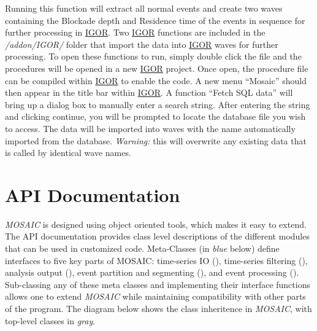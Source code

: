 \documentclass[letterpaper,10pt,english]{sphinxmanual}
\begin{document}
Running this function will extract all normal events and create two waves containing the Blockade depth and Residence time of the events in sequence for further processing in \href{http://www.wavemetrics.com/products/igorpro/igorpro.htm}{IGOR}.  Two \href{http://www.wavemetrics.com/products/igorpro/igorpro.htm}{IGOR} functions are included in the \emph{/addon/IGOR/} folder that import the data into \href{http://www.wavemetrics.com/products/igorpro/igorpro.htm}{IGOR} waves for further processing. To open these functions to run, simply double click the file and the procedures will be opened in a new \href{http://www.wavemetrics.com/products/igorpro/igorpro.htm}{IGOR} project.  Once open, the procedure file can be compiled within \href{http://www.wavemetrics.com/products/igorpro/igorpro.htm}{IGOR} to enable the code.  A new menu ``Mosaic'' should then appear in the title bar within \href{http://www.wavemetrics.com/products/igorpro/igorpro.htm}{IGOR}.  A function ``Fetch SQL data'' will bring up a dialog box to manually enter a search string.  After entering the string and clicking continue, you will be prompted to locate the database file you wish to access.  The data will be imported into waves with the name automatically imported from the database.  \emph{Warning:} this will overwrite any existing data that is called by identical wave names.


\chapter{API Documentation}
\label{doc/apidocs:id72}\label{doc/apidocs:api-docs-page}\label{doc/apidocs::doc}\label{doc/apidocs:api-documentation}
\emph{MOSAIC} is designed using object oriented tools, which makes it easy to extend. The API documentation provides class level descriptions of the different modules that can be used in customized code. Meta-Classes (in \emph{blue} below) define interfaces to five key parts of MOSAIC: time-series IO ({\hyperref[api\string-doc/mosaic.meta:mosaic.metaTrajIO.metaTrajIO]{\emph{}}}), time-series filtering ({\hyperref[api\string-doc/mosaic.meta:mosaic.metaIOFilter.metaIOFilter]{\emph{}}}), analysis output ({\hyperref[api\string-doc/mosaic.meta:mosaic.metaMDIO.metaMDIO]{\emph{}}}), event partition and segmenting ({\hyperref[api\string-doc/mosaic.meta:mosaic.metaEventPartition.metaEventPartition]{\emph{}}}), and event processing ({\hyperref[api\string-doc/mosaic.meta:mosaic.metaEventProcessor.metaEventProcessor]{\emph{}}}). Sub-classing any of these meta classes and implementing their interface functions allows one to extend \emph{MOSAIC} while maintaining compatibility with other parts of the program. The diagram below shows the class inheritence in \emph{MOSAIC}, with top-level classes in \emph{gray}.
\end{document}
